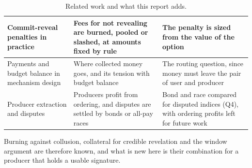 \documentclass[11pt]{article}
\begin{document}
\begin{table}[htbp]
\begin{tabularx}{\textwidth}{|>{\raggedright\arraybackslash}p{3.3cm}|Y|Y|}
\hline
Commit-reveal penalties in practice~\cite{eip8209,canidio2023commitment,lee2025commitreveal,sip80,eip8184} & Fees for not revealing are burned, pooled or slashed, at amounts fixed by rule & The penalty is sized from the value of the option \\
\hline
Payments and budget balance in mechanism design~\cite{vickrey1961,clarke1971,groves1973,greenlaffont1977,cavallo2006,guoconitzer2009,myerson1981} & Where collected money goes, and its tension with budget balance & The routing question, since money must leave the pair of user and producer \\
\hline
Producer extraction and disputes~\cite{daian2020flashboys,luu2015demystifying,kalodner2018arbitrum,mccorry2019pisa,baye1996allpay} & Producers profit from ordering, and disputes are settled by bonds or all-pay races & Bond and race compared for disputed indices (Q4), with ordering profits left for future work \\
\hline
\end{tabularx}
\caption{Related work and what this report adds.}\label{tab:related}
\end{table}

Burning against collusion, collateral for credible revelation and the window argument are therefore known, and what is new here is their combination for a producer that holds a usable signature.
\end{document}
